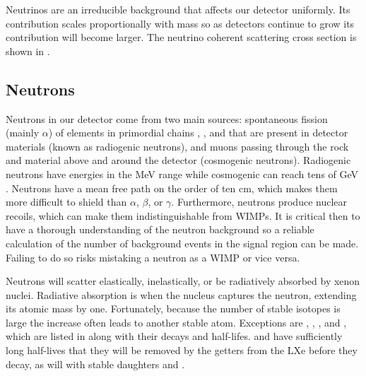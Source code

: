 Neutrinos are an irreducible background that affects our detector uniformly.  Its contribution scales proportionally with mass so as
detectors continue to grow its contribution will become larger.  The neutrino coherent scattering cross section is shown in
.


\subsection{Neutrons}
\label{subsec:neutrons}
Neutrons in our detector come from two main sources: spontaneous fission (mainly $\alpha$) of elements in primordial chains
\uranium, , and  that are present in detector materials (known as radiogenic neutrons), and muons
passing through the rock and material above and around the detector (cosmogenic neutrons).  Radiogenic neutrons have energies in the MeV
range
while cosmogenic can reach tens of GeV .  Neutrons have a mean free path on the order of ten cm, which makes
them more difficult to shield than $\alpha$, $\beta$, or $\gamma$.  Furthermore, neutrons produce nuclear recoils, which can make
them indistinguishable from WIMPs.  It is critical then to have a thorough understanding of the neutron background so a reliable
calculation of the number of background events in the signal region can be made.  Failing to do so risks mistaking a neutron as a WIMP or
vice versa.

Neutrons will scatter elastically, inelastically, or be radiatively absorbed by xenon nuclei.  Radiative absorption is when the
nucleus captures the neutron, extending its atomic mass by one.  Fortunately, because the number of stable isotopes is large the increase
often leads to another stable
atom.  Exceptions are , , , and , which are listed in 
along with their decays and half-lifes.   and  have sufficiently long half-lives that they will be removed
by the getters from the LXe before they decay, as will with stable daughters  and .

